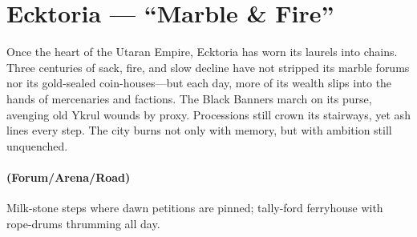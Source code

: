 \section{Ecktoria --- ``Marble \& Fire''}
\label{chap:ecktoria}

\begin{tcolorbox}[colback=black!3,colframe=black!40!white,title={Theme \& Atmosphere}]
Once the heart of the Utaran Empire, Ecktoria has worn its laurels into chains. Three centuries of sack, fire, and slow decline have not stripped its marble forums nor its gold-sealed coin-houses---but each day, more of its wealth slips into the hands of mercenaries and factions. The Black Banners march on its purse, avenging old Ykrul wounds by proxy. Processions still crown its stairways, yet ash lines every step. The city burns not only with memory, but with ambition still unquenched.
\end{tcolorbox}

\paragraph*{(Forum/Arena/Road)} Milk-stone steps where dawn petitions are pinned; tally-ford ferryhouse with rope-drums thrumming all day.

